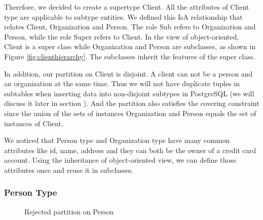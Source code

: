 \documentclass[11pt]{article}
\begin{document}
\par
Therefore, we decided to create a supertype Client. All the attributes of Client type are applicable to subtype entities. We defined this IsA relationship that relates Client, Organization and Person. The role Sub refers to Organization and Person, while the role Super refers to Client. In the view of object-oriented, Client is a super class while Organization and Person are subclasses, as shown in Figure \ref{fig:clienthierarchy}. The subclasses inherit the features of the super class.
\par
In addition, our partition on Client is disjoint. A client can not be a person and an organization at the same time. Thus we will not have duplicate tuples in subtables when inserting data into non-disjoint subtypes in PostgreSQL (we will discuss it later in section \label{ref:ptype}). And the partition also satisfies the covering constraint since the union of the sets of instances Organization and Person equals the set of instances of Client.
\par
We noticed that Person type and Organization type have many common attributes like id, name, address and they can both be the owner of a credit card account. Using the inheritance of object-oriented view, we can define those attributes once and reuse it in subclasses.
\par


\subsubsection{Person Type}
\label{sec:ptype}

\begin{figure}
\centering
{}
\caption{Rejected partition on Person}
\label{fig:personhierarchy}
\end{figure}
\end{document}
